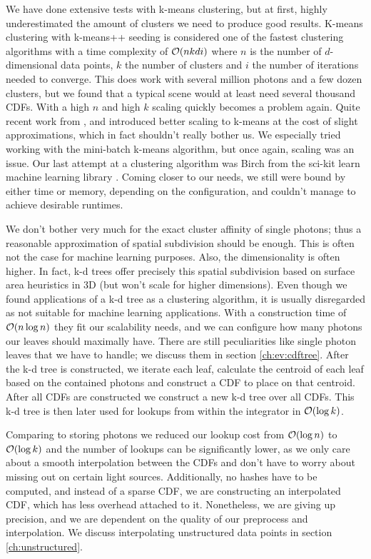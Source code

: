 We have done extensive tests with k-means clustering, but at first, highly underestimated the amount of clusters we need to produce good results. K-means clustering with k-means++ seeding \cite{DBLP:conf/soda/ArthurV07} is considered one of the fastest clustering algorithms with a time complexity of $\mathcal{O}(nkdi)$ where $n$ is the number of $d$-dimensional data points, $k$ the number of clusters and $i$ the number of iterations needed to converge. This does work with several million photons and a few dozen clusters, but we found that a typical scene would at least need several thousand CDFs. With a high $n$ and high $k$ scaling quickly becomes a problem again. Quite recent work from \cite{DBLP:conf/kse/HieuM14}, \cite{DBLP:journals/tpds/XuQLMLL14} and \cite{DBLP:conf/www/Sculley10} introduced better scaling to k-means at the cost of slight approximations, which in fact shouldn't really bother us. We especially tried working with the mini-batch k-means algorithm, but once again, scaling was an issue. Our last attempt at a clustering algorithm was Birch \cite{DBLP:conf/sigmod/ZhangRL96} from the sci-kit learn machine learning library \cite{scikit-learn}. Coming closer to our needs, we still were bound by either time or memory, depending on the configuration, and couldn't manage to achieve desirable runtimes.

We don't bother very much for the exact cluster affinity of single photons; thus a reasonable approximation of spatial subdivision should be enough. This is often not the case for machine learning purposes. Also, the dimensionality is often higher. In fact, k-d trees offer precisely this spatial subdivision based on surface area heuristics in 3D (but won't scale for higher dimensions). Even though we found applications of a k-d tree as a clustering algorithm, it is usually disregarded as not suitable for machine learning applications. With a construction time of $\mathcal{O}(n \log n)$ they fit our scalability needs, and we can configure how many photons our leaves should maximally have. There are still peculiarities like single photon leaves that we have to handle; we discuss them in section \ref{ch:ev:cdftree}. After the k-d tree is constructed, we iterate each leaf, calculate the centroid of each leaf based on the contained photons and construct a CDF to place on that centroid. After all CDFs are constructed we construct a new k-d tree over all CDFs. This k-d tree is then later used for lookups from within the integrator in $\mathcal{O}(\log k)$.

Comparing to storing photons we reduced our lookup cost from $\mathcal{O}(\log n)$ to $\mathcal{O}(\log k)$ and the number of lookups can be significantly lower, as we only care about a smooth interpolation between the CDFs and don't have to worry about missing out on certain light sources. Additionally, no hashes have to be computed, and instead of a sparse CDF, we are constructing an interpolated CDF, which has less overhead attached to it. Nonetheless, we are giving up precision, and we are dependent on the quality of our preprocess and interpolation. We discuss interpolating unstructured data points in section \ref{ch:unstructured}.

